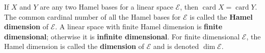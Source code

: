 If $X$ and $Y$ are any two Hamel bases for a linear space $\mathcal{E}$, then $\operatorname{card} X = \operatorname{card} Y$. The common cardinal number of all the Hamel bases for $\mathcal{E}$ is called the \textbf{Hamel dimension} of $\mathcal{E}$. A linear space with finite Hamel dimension is \textbf{finite dimensional}; otherwise it is \textbf{infinite dimensional}. For finite dimensional $\mathcal{E}$, the Hamel dimension is called the \textbf{dimension} of $\mathcal{E}$ and is denoted $\dim \mathcal{E}$.
